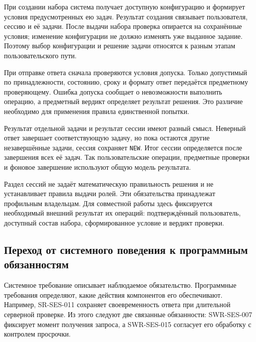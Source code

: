 \documentclass[12pt,a4paper]{article}
\begin{document}
При создании набора система получает доступную конфигурацию и формирует условия предусмотренных ею задач. Результат создания связывает пользователя, сессию и её задачи. После выдачи набора проверка опирается на сохранённые условия; изменение конфигурации не должно изменять уже выданное задание. Поэтому выбор конфигурации и решение задачи относятся к разным этапам пользовательского пути.

При отправке ответа сначала проверяются условия допуска. Только допустимый по принадлежности, состоянию, сроку и формату ответ передаётся предметному проверяющему. Ошибка допуска сообщает о невозможности выполнить операцию, а предметный вердикт определяет результат решения. Это различие необходимо для применения правила единственной попытки.

Результат отдельной задачи и результат сессии имеют разный смысл. Неверный ответ завершает соответствующую задачу, но пока остаются другие незавершённые задачи, сессия сохраняет \texttt{NEW}. Итог сессии определяется после завершения всех её задач. Так пользовательские операции, предметные проверки и фоновое завершение используют общую модель результата.

Раздел сессий не задаёт математическую правильность решения и не устанавливает правила выдачи ролей. Эти обязательства принадлежат профильным владельцам. Для совместной работы здесь фиксируется необходимый внешний результат их операций: подтверждённый пользователь, доступный состав набора, сформированное условие и вердикт проверки.

\subsection{Переход от системного поведения к программным обязанностям}\label{ux43fux435ux440ux435ux445ux43eux434-ux43eux442-ux441ux438ux441ux442ux435ux43cux43dux43eux433ux43e-ux43fux43eux432ux435ux434ux435ux43dux438ux44f-ux43a-ux43fux440ux43eux433ux440ux430ux43cux43cux43dux44bux43c-ux43eux431ux44fux437ux430ux43dux43dux43eux441ux442ux44fux43c}

\hypertarget{переход-от-системного-поведения-к-программным-обязанностям}{}

Системное требование описывает наблюдаемое обязательство. Программные требования определяют, какие действия компонентов его обеспечивают. Например, SR-SES-011 сохраняет своевременность ответа при длительной серверной проверке. Из этого следуют две связанные обязанности: SWR-SES-007 фиксирует момент получения запроса, а SWR-SES-015 согласует его обработку с контролем просрочки.
\end{document}
